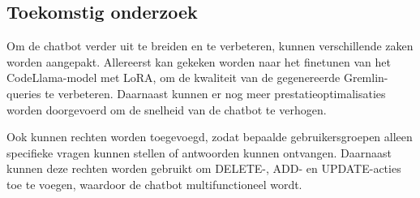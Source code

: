 \documentclass[a0,portrait]{hogent-poster}
\begin{document}
\begin{multicols}{2}
\section{Toekomstig onderzoek}

Om de chatbot verder uit te breiden en te verbeteren, kunnen verschillende zaken worden aangepakt.
Allereerst kan gekeken worden naar het finetunen van het CodeLlama-model met LoRA, om de kwaliteit van de gegenereerde Gremlin-queries te verbeteren.
Daarnaast kunnen er nog meer prestatieoptimalisaties worden doorgevoerd om de snelheid van de chatbot te verhogen.

Ook kunnen rechten worden toegevoegd, zodat bepaalde gebruikersgroepen alleen specifieke vragen kunnen stellen of antwoorden kunnen ontvangen.
Daarnaast kunnen deze rechten worden gebruikt om DELETE-, ADD- en UPDATE-acties toe te voegen, waardoor de chatbot multifunctioneel wordt.

\end{multicols}
\end{document}

